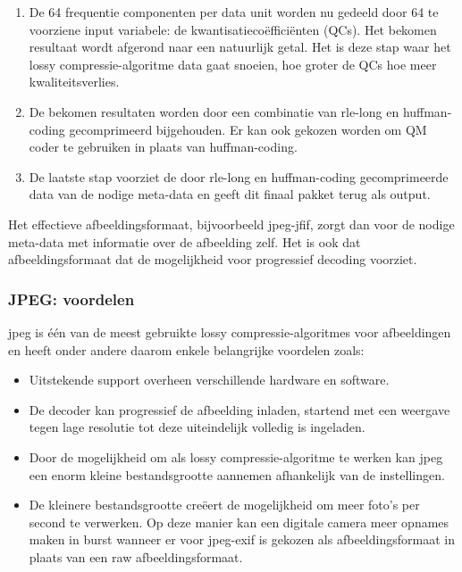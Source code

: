\begin{enumerate}
	\item De 64 frequentie componenten per data unit worden nu gedeeld door 64 te voorziene input variabele: de kwantisatiecoëfficiënten (QCs). Het bekomen resultaat wordt afgerond naar een natuurlijk getal. Het is deze stap waar het \gls{lossy} \gls{compressie-algoritme} data gaat snoeien, hoe groter de QCs hoe meer kwaliteitsverlies.
	
	\item De bekomen resultaten worden door een combinatie van \gls{rle-long} en \gls{huffman-coding} gecomprimeerd bijgehouden. Er kan ook gekozen worden om QM coder te gebruiken in plaats van \gls{huffman-coding}.
	
	\item De laatste stap voorziet de door \gls{rle-long} en \gls{huffman-coding} gecomprimeerde data van de nodige \gls{meta-data} en geeft dit finaal pakket terug als output.

\end{enumerate}

Het effectieve afbeeldingsformaat, bijvoorbeeld \gls{jpeg-jfif}, zorgt dan voor de nodige \gls{meta-data} met informatie over de afbeelding zelf. Het is ook dat \gls{afbeeldingsformaat} dat de mogelijkheid voor progressief \gls{decoding} voorziet.

\subsubsection{JPEG: voordelen}
\label{sec:afbeeldingscompressie-jpeg-voordelen}

\Gls{jpeg} is één van de meest gebruikte \gls{lossy} \glspl{compressie-algoritme} voor afbeeldingen en heeft onder andere daarom enkele belangrijke voordelen zoals:

\begin{itemize}
	\item Uitstekende support overheen verschillende hardware en software.
	
	\item De  \gls{decoder} kan progressief de afbeelding inladen, startend met een weergave tegen lage resolutie tot deze uiteindelijk volledig is ingeladen.
	
	\item Door de mogelijkheid om als \gls{lossy} \gls{compressie-algoritme} te werken kan \gls{jpeg} een enorm kleine bestandsgrootte aannemen afhankelijk van de instellingen.
	
	\item De kleinere bestandsgrootte creëert de mogelijkheid om meer foto's per second te verwerken. Op deze manier kan een digitale camera meer opnames maken in burst wanneer er voor \gls{jpeg-exif} is gekozen als \gls{afbeeldingsformaat} in plaats van een \gls{raw} \gls{afbeeldingsformaat}. 
\end{itemize}

